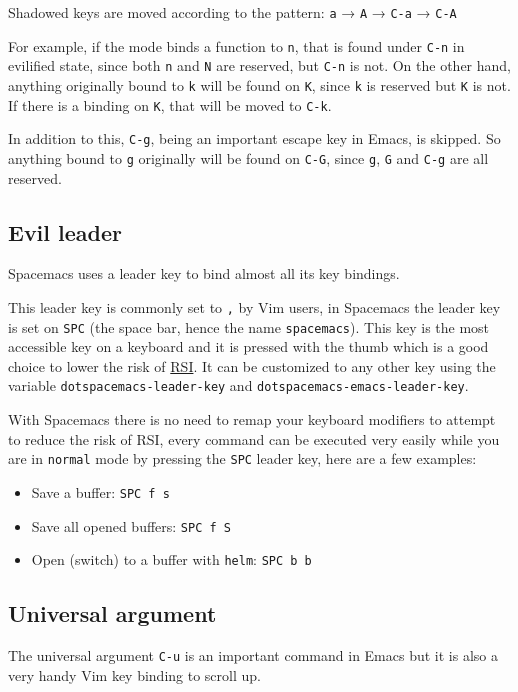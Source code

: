 \documentclass[11pt]{article}
\begin{document}
Shadowed keys are moved according to the pattern: \texttt{a} → \texttt{A} → \texttt{C-a} → \texttt{C-A}

For example, if the mode binds a function to \texttt{n}, that is found under \texttt{C-n} in
evilified state, since both \texttt{n} and \texttt{N} are reserved, but \texttt{C-n} is not. On the
other hand, anything originally bound to \texttt{k} will be found on \texttt{K}, since \texttt{k} is
reserved but \texttt{K} is not. If there is a binding on \texttt{K}, that will be moved to
\texttt{C-k}.

In addition to this, \texttt{C-g}, being an important escape key in Emacs, is skipped.
So anything bound to \texttt{g} originally will be found on \texttt{C-G}, since \texttt{g}, \texttt{G} and
\texttt{C-g} are all reserved.

\subsection{Evil leader}
\label{sec:orgaeaa318}
Spacemacs uses a leader key to bind almost all its key bindings.

This leader key is commonly set to \texttt{​,​} by Vim users, in Spacemacs the leader
key is set on \texttt{SPC} (the space bar, hence the name \texttt{spacemacs}). This key is the
most accessible key on a keyboard and it is pressed with the thumb which is a
good choice to lower the risk of \href{http://en.wikipedia.org/wiki/Repetitive\_strain\_injury}{RSI}. It can be customized to any other key
using the variable \texttt{dotspacemacs-leader-key} and \texttt{dotspacemacs-emacs-leader-key}.

With Spacemacs there is no need to remap your keyboard modifiers to attempt
to reduce the risk of RSI, every command can be executed very easily while you
are in \texttt{normal} mode by pressing the \texttt{SPC} leader key, here are a few examples:

\begin{itemize}
\item Save a buffer: \texttt{SPC f s}
\item Save all opened buffers: \texttt{SPC f S}
\item Open (switch) to a buffer with \texttt{helm}: \texttt{SPC b b}
\end{itemize}

\subsection{Universal argument}
\label{sec:org77616c7}
The universal argument \texttt{C-u} is an important command in Emacs but it is also a
very handy Vim key binding to scroll up.
\end{document}
